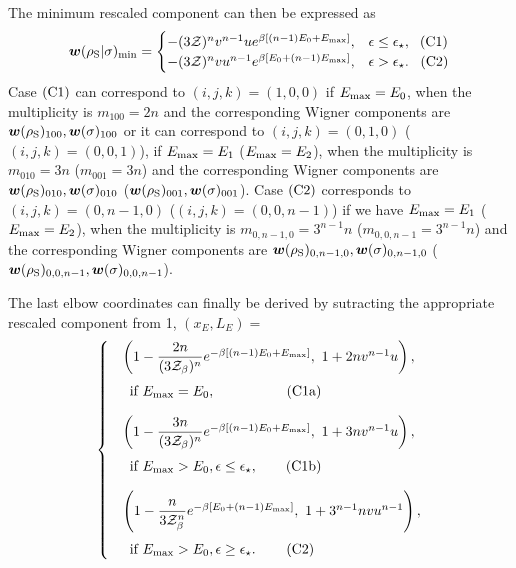 \documentclass[pra,
aps,
twocolumn,
superscriptaddress,
groupedaddress,
nofootinbib,
reprint
]{revtex4-1}
\begin{document}
The minimum rescaled component can then be expressed as
\begin{equation}
\bm{w}(\rho_{\rm{S}} | \sigma)_{\rm{min}} =
	\begin{cases}
		-(3\mathcal{Z})^{n} v^{n-1} u e^{\beta [(n-1)E_0 + E_{\rm{max}}]}, &\epsilon \leq \epsilon_{\star},\ \hspace{3pt}\rm{(C1)}	\\
		-(3\mathcal{Z})^{n} v u^{n-1} e^{\beta [E_0 + (n-1)E_{\rm{max}}]}, &\epsilon > \epsilon_{\star}.\ \hspace{5pt}\rm{(C2)} 
	\end{cases}
\end{equation}
Case $\rm{(C1)}$ can correspond to $(i,j,k) = (1,0,0)$ if $E_{\rm{max}} = E_0$, when the multiplicity is $m_{100} = 2n$ and the corresponding Wigner components are $\bm{w}(\rho_{\rm{S}})_{100}, \bm{w}(\sigma)_{100}$ or it can correspond to $(i,j,k) = (0,1,0)$ ($(i,j,k) = (0,0,1)$), if $E_{\rm{max}} = E_1$ ($E_{\rm{max}} = E_2$), when the multiplicity is $m_{010} = 3n$ ($m_{001} = 3n$) and the corresponding Wigner components are $\bm{w}(\rho_{\rm{S}})_{010}, \bm{w}(\sigma)_{010}$ ($\bm{w}(\rho_{\rm{S}})_{001}, \bm{w}(\sigma)_{001}$).
Case $\rm{(C2)}$ corresponds to $(i,j,k) = (0,n-1,0)$ ($(i,j,k) = (0,0,n-1)$)
if we have $E_{\rm{max}} = E_1$ ($E_{\rm{max}} = E_2$), when the multiplicity is $m_{0,n-1,0} = 3^{n-1}n$ ($m_{0,0,n-1} = 3^{n-1}n$) and the corresponding Wigner components are $\bm{w}(\rho_{\rm{S}})_{0,n-1,0}, \bm{w}(\sigma)_{0,n-1,0}$ ($\bm{w}(\rho_{\rm{S}})_{0,0,n-1}, \bm{w}(\sigma)_{0,0,n-1}$).

The last elbow coordinates can finally be derived by sutracting the appropriate rescaled component from 1, $(x_E, L_E) =$
\begin{equation}\label{eq:last_elb_coords}
	\begin{cases}
		&\left( 1-\dfrac{2n}{(3\Z_\beta)^n}e^{-\beta [(n-1)E_0 + E_{\rm{max}}]},\ 1 + 2n v^{n-1} u \right), \vspace{5pt}\\
		&\hspace{5pt} \text{if } E_{\rm{max}} = E_0, \hspace{51pt}\rm{(C1a)} \vspace{10pt}\\
		&\left( 1-\dfrac{3n}{(3\Z_\beta)^n}e^{-\beta [(n-1)E_0 + E_{\rm{max}}]},\ 1 + 3n v^{n-1} u \right), \vspace{5pt}\\
		&\hspace{5pt} \text{if } E_{\rm{max}} > E_0, \epsilon \leq \epsilon_{\star}, \hspace{20pt}\rm{(C1b)} \vspace{10pt}\\
		&\left( 1-\dfrac{n}{3\Z_\beta^n}e^{-\beta [E_0 + (n-1)E_{\rm{max}}]},\ 1 + 3^{n-1}n v u^{n-1} \right), \vspace{5pt}\\
		&\hspace{5pt} \text{if } E_{\rm{max}} > E_0, \epsilon \geq \epsilon_{\star}. \hspace{22pt}\rm{(C2)}
	\end{cases}
\end{equation}
\end{document}
